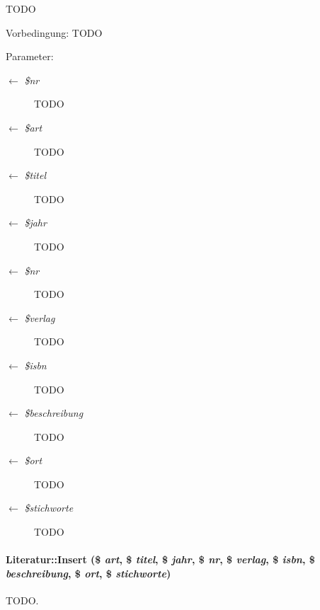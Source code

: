 TODO \begin{Desc}
\item[Vorbedingung:]TODO \end{Desc}
\begin{Desc}
\item[Parameter:]
\begin{description}
\item[\mbox{$\leftarrow$} {\em \$nr}]TODO \item[\mbox{$\leftarrow$} {\em \$art}]TODO \item[\mbox{$\leftarrow$} {\em \$titel}]TODO \item[\mbox{$\leftarrow$} {\em \$jahr}]TODO \item[\mbox{$\leftarrow$} {\em \$nr}]TODO \item[\mbox{$\leftarrow$} {\em \$verlag}]TODO \item[\mbox{$\leftarrow$} {\em \$isbn}]TODO \item[\mbox{$\leftarrow$} {\em \$beschreibung}]TODO \item[\mbox{$\leftarrow$} {\em \$ort}]TODO \item[\mbox{$\leftarrow$} {\em \$stichworte}]TODO \end{description}
\end{Desc}
\hypertarget{classLiteratur_0379134616374fa2b1bc7b9a761f3970}{
\paragraph[Insert]{\setlength{\rightskip}{0pt plus 5cm}Literatur::Insert (\$ {\em art}, \$ {\em titel}, \$ {\em jahr}, \$ {\em nr}, \$ {\em verlag}, \$ {\em isbn}, \$ {\em beschreibung}, \$ {\em ort}, \$ {\em stichworte})}\hfill}
\label{classLiteratur_0379134616374fa2b1bc7b9a761f3970}


TODO. 

